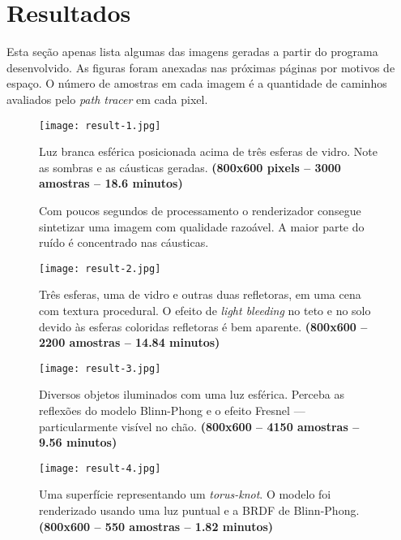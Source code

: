 \documentclass[11pt,a4paper]{article}
\begin{document}
\section{Resultados}
\label{sec:results}

Esta seção apenas lista algumas das imagens geradas a partir do programa desenvolvido. As figuras foram anexadas nas próximas páginas por motivos de espaço. O número de amostras em cada imagem é a quantidade de caminhos avaliados pelo \textit{path tracer} em cada pixel.

\begin{figure}[htpb]
  \centering
  \texttt{[image: result-1.jpg]}
  \caption{Luz branca esférica posicionada acima de três esferas de vidro. Note as sombras e as cáusticas geradas. \textbf{(800x600 pixels -- 3000 amostras -- 18.6 minutos)}}
\end{figure}

\begin{figure}[htpb]
  \centering
  \caption{Com poucos segundos de processamento o renderizador consegue sintetizar uma imagem com qualidade razoável. A maior parte do ruído é concentrado nas cáusticas.}
\end{figure}

\begin{figure}[htpb]
  \centering
  \texttt{[image: result-2.jpg]}
  \caption{Três esferas, uma de vidro e outras duas refletoras, em uma cena com textura procedural. O efeito de \textit{light bleeding} no teto e no solo devido às esferas coloridas refletoras é bem aparente. \textbf{(800x600 -- 2200 amostras -- 14.84 minutos)}}
\end{figure}

\begin{figure}[htpb]
  \centering
  \texttt{[image: result-3.jpg]}
  \caption{Diversos objetos iluminados com uma luz esférica. Perceba as reflexões do modelo Blinn-Phong e o efeito Fresnel --- particularmente visível no chão. \textbf{(800x600 -- 4150 amostras -- 9.56 minutos)}}
\end{figure}

\begin{figure}[htpb]
  \centering
  \texttt{[image: result-4.jpg]}
  \caption{Uma superfície representando um \textit{torus-knot}. O modelo foi renderizado usando uma luz puntual e a BRDF de Blinn-Phong. \textbf{(800x600 -- 550 amostras -- 1.82 minutos)}}
\end{figure}
\end{document}
